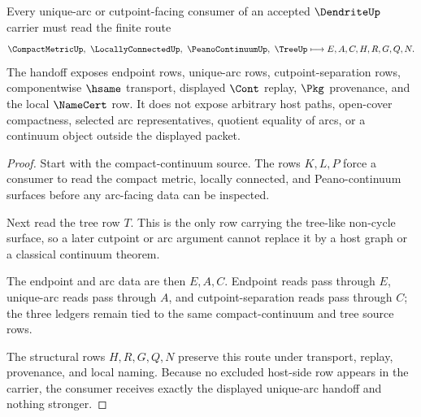 \begin{theorem}
\label{thm:dendrite-unique-arc-handoff}
Every unique-arc or cutpoint-facing consumer of an accepted $\DendriteUp$ carrier must read the finite route
$$
\CompactMetricUp,\ \LocallyConnectedUp,\ \PeanoContinuumUp,\ \TreeUp
\longmapsto
E,A,C,H,R,G,Q,N .
$$
The handoff exposes endpoint rows, unique-arc rows, cutpoint-separation rows, componentwise $\hsame$ transport, displayed $\Cont$ replay, $\Pkg$ provenance, and the local $\NameCert$ row. It does not expose arbitrary host paths, open-cover compactness, selected arc representatives, quotient equality of arcs, or a continuum object outside the displayed packet.
\end{theorem}
\begin{proof}
Start with the compact-continuum source. The rows $K,L,P$ force a consumer to read the compact metric, locally connected, and Peano-continuum surfaces before any arc-facing data can be inspected.

Next read the tree row $T$. This is the only row carrying the tree-like non-cycle surface, so a later cutpoint or arc argument cannot replace it by a host graph or a classical continuum theorem.

The endpoint and arc data are then $E,A,C$. Endpoint reads pass through $E$, unique-arc reads pass through $A$, and cutpoint-separation reads pass through $C$; the three ledgers remain tied to the same compact-continuum and tree source rows.

The structural rows $H,R,G,Q,N$ preserve this route under transport, replay, provenance, and local naming. Because no excluded host-side row appears in the carrier, the consumer receives exactly the displayed unique-arc handoff and nothing stronger.
\end{proof}



